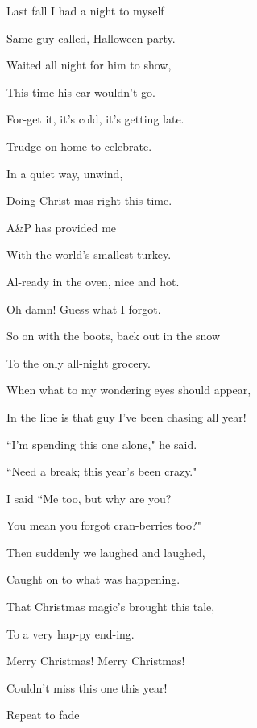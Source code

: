 Last fall I had a night to myself

Same guy called, Halloween party.

Waited all night for him to show,

This time his car wouldn't go.

For-get it, it's cold, it's getting late.

Trudge on home to celebrate.

In a quiet way, unwind,

Doing Christ-mas right this time.   

A\&P has provided me

With the world's smallest turkey.

Al-ready in the oven, nice and hot.

Oh damn! Guess what I forgot.

So on with the boots, back out in the snow

To the only all-night grocery.

When what to my wondering eyes should appear,

In the line is that guy I've been chasing all year!

``I'm spending this one alone," he said.

``Need a break; this year's been crazy."

I said ``Me too, but why are you?

You mean you forgot cran-berries too?"

Then suddenly we laughed and laughed,

Caught on to what was happening.

That Christmas magic's brought this tale,

To a very hap-py end-ing.   

Merry Christmas! Merry Christmas!

Couldn't miss this one this year!

Repeat to fade






